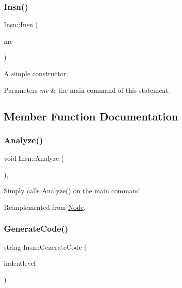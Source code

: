 \subsubsection{\texorpdfstring{Insn()}{Insn()}}
{\footnotesize\ttfamily Insn\+::\+Insn (\begin{DoxyParamCaption}\item[{\hyperlink{class_main_cmd}{Main\+Cmd} $\ast$}]{mc }\end{DoxyParamCaption})}

A simple constructor. 
\begin{DoxyParams}{Parameters}
{\em mc} & the main command of this statement. \\
\hline
\end{DoxyParams}


\subsection{Member Function Documentation}
\mbox{\label{class_insn_a1e175152ea14cde985c5176e5a226f3d}} 
\subsubsection{\texorpdfstring{Analyze()}{Analyze()}}
{\footnotesize\ttfamily void Insn\+::\+Analyze (\begin{DoxyParamCaption}{ }\end{DoxyParamCaption})\hspace{0.3cm}{\ttfamily [inline]}, {\ttfamily [virtual]}}

Simply calls \hyperlink{class_insn_a1e175152ea14cde985c5176e5a226f3d}{Analyze()} on the main command. 

Reimplemented from \hyperlink{class_node_a5f88d55c6f253a29def7ccc443d83d47}{Node}.

\mbox{\label{class_insn_a0bbea68b179d943f1a87aeb6c1b15dac}} 
\subsubsection{\texorpdfstring{Generate\+Code()}{GenerateCode()}}
{\footnotesize\ttfamily string Insn\+::\+Generate\+Code (\begin{DoxyParamCaption}\item[{int}]{indentlevel }\end{DoxyParamCaption})\hspace{0.3cm}{\ttfamily [virtual]}}

